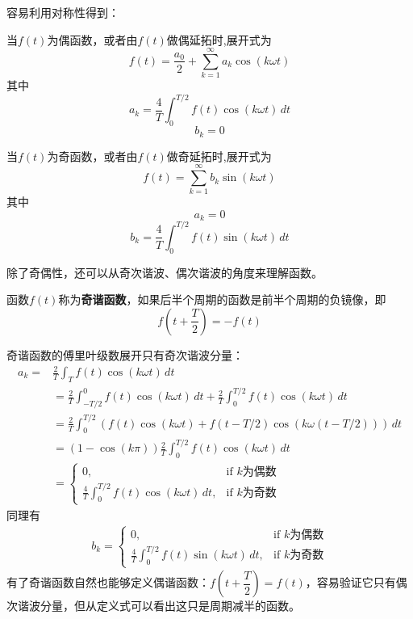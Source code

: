 容易利用对称性得到：
\begin{claim}[偶函数的傅里叶展开]
当$f(t)$为偶函数，或者由$f(t)$做偶延拓时,展开式为
\[f(t)=\frac{a_0}{2}+\sum_{k = 1}^{\infty} a_k\cos(k\omega t)\]
其中
\[a_k=\frac{4}{T}\int_{0}^{T/2} f(t)\cos(k\omega t)\,dt\]
\[b_k=0\]
\end{claim}\begin{claim}[奇函数的傅里叶展开]
当$f(t)$为奇函数，或者由$f(t)$做奇延拓时,展开式为
\[f(t)=\sum_{k = 1}^{\infty} b_k \sin(k\omega t)\]
其中
\[a_k=0\]
\[b_k=\frac{4}{T}\int_{0}^{T/2} f(t)\sin(k\omega t)\,dt\]
\end{claim}

除了奇偶性，还可以从奇次谐波、偶次谐波的角度来理解函数。
\begin{definition}[奇谐函数]
    函数$f(t)$称为\textbf{奇谐函数}，如果后半个周期的函数是前半个周期的负镜像，即\begin{equation*}
    f\left(t+\frac{T}{2}\right)=-f(t)
\end{equation*}
\end{definition}
奇谐函数的傅里叶级数展开只有奇次谐波分量：
\begin{align*}
    a_k =&\frac{2}{T}\int_{T}f(t)\cos(k\omega t)\,dt\\
    &=\frac{2}{T}\int_{-T/2}^{0}f(t)\cos(k\omega t)\,dt+\frac{2}{T}\int_{0}^{T/2}f(t)\cos(k\omega t)\,dt\\
    &=\frac{2}{T}\int_{0}^{T/2}\left(f(t)\cos(k\omega t)+f(t-T/2)\cos(k\omega(t-T/2))\right)\,dt\\
    &=(1-\cos(k\pi))\frac{2}{T}\int_{0}^{T/2}f(t)\cos(k\omega t)\,dt\\
    &=\begin{cases}
        0,&\text{if }k\text{为偶数}\\
        \frac{4}{T}\int_{0}^{T/2}f(t)\cos(k\omega t)\,dt,&\text{if }k\text{为奇数}
    \end{cases}
\end{align*}
同理有\begin{align*}
    b_k=\begin{cases}
        0,&\text{if }k\text{为偶数}\\
        \frac{4}{T}\int_{0}^{T/2}f(t)\sin(k\omega t)\,dt,&\text{if }k\text{为奇数}
    \end{cases}
\end{align*}
有了奇谐函数自然也能够定义偶谐函数：$f\left(t+\dfrac{T}{2}\right)=f(t)$，容易验证它只有偶次谐波分量，但从定义式可以看出这只是周期减半的函数。

